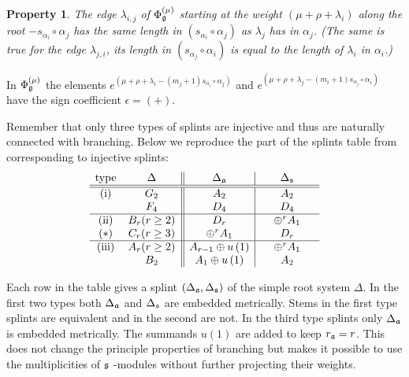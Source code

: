 \documentclass[12pt]{article}
\newtheorem{Prop}[Def]{Property}
\begin{document}
\begin{Prop}
The edge $\lambda _{i,j}$ of $\Phi _{\frak{g}}^{\left( \mu \right) }$
starting at the weight $\left( \mu +\rho +\lambda _{i}\right) $ along the
root $-s_{\alpha _{i}}\circ \alpha _{j}$ has the same length in $(s_{\alpha
_{i}}\circ \alpha _{j})$ as $\lambda _{j}$ has in $\alpha _{j}$. (The same
is true for the edge $\lambda _{j,i}$, its length in $(s_{\alpha _{j}}\circ
\alpha _{i})$ is equal to the length of $\lambda _{i}$ in $\alpha _{i}$.)
\label{diagram property}
\end{Prop}

In $\Phi _{\frak{g}}^{\left( \mu \right) }$ the elements $e^{\left( \mu
+\rho +\lambda _{i}-(m_{j}+1)s_{\alpha _{i}}\circ \alpha _{j}\right) }$ and $%
e^{\left( \mu +\rho +\lambda _{j}-(m_{i}+1)s_{\alpha _{j}}\circ \alpha
_{i}\right) }$ have the sign coefficient  $\epsilon =(+)$.

Remember that only three types of splints are
injective and thus are naturally connected with branching. Below we
reproduce the part of the splints table from \cite{richter2008splints} corresponding to
injective splints:
\begin{equation}
\label{eq:1}
\begin{array}{cc||c|c}
\hbox{type} & \hspace{0.25in}\Delta \hspace{0.25in} & \hspace{0.25in}\Delta
_{\frak{a}}\hspace{0.25in} & \hspace{0.25in}\Delta _{\frak{s}}\hspace{0.25in}
\\ \hline\hline
\hbox{(i)} & G_{2} & A_{2} & A_{2} \\
& F_{4} & D_{4} & D_{4} \\ \hline
\hbox{(ii)} & B_{r}(r\geq 2) & D_{r} & \oplus ^{r}A_{1} \\
(*)& C_{r}(r\geq 3) & \oplus ^{r}A_{1} &  D_{r} \\ \hline
\hbox{(iii)} & A_{r}(r\geq 2) & A_{r-1}\oplus u\left( 1\right)  & \oplus
^{r}A_{1} \\
& B_{2} & A_{1}\oplus u\left( 1\right)  & A_{2}
\end{array}
\end{equation}

Each row in the table gives a splint $(\Delta _{\frak{a}},\Delta _{\frak{s}})
$ of the simple root system $\Delta $. In the first two types both $\Delta _{%
\frak{a}}$ and $\Delta _{\frak{s}}$ are embedded metrically. Stems in the
first type splints are equivalent and in the second are not. In the third
type splints only $\Delta _{\frak{a}}$ is embedded metrically. The summands $%
u\left( 1\right) $ are added to keep $r_{\frak{a}}=r$. This does not change
the principle properties of branching but makes it possible to use the
multiplicities of $\frak{s}$ -modules without further projecting their
weights.
\end{document}
